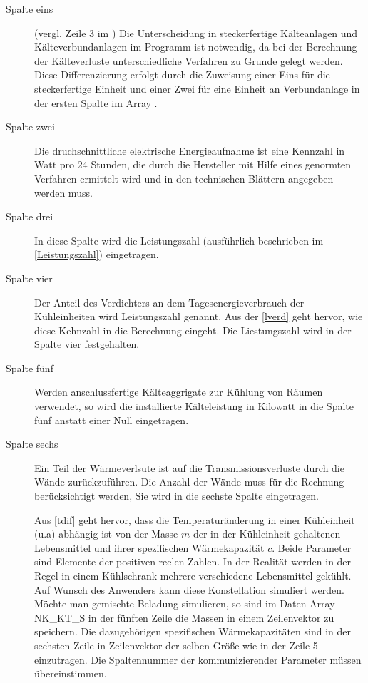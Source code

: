 \begin{description}

	\item [{Spalte eins}] (vergl. Zeile 3 im ) Die Unterscheidung in
	steckerfertige Kälteanlagen und Kälteverbundanlagen im Programm ist notwendig, da bei der Berechnung der
	Kälteverluste unterschiedliche Verfahren zu Grunde gelegt werden.  Diese
	Differenzierung erfolgt durch die Zuweisung einer Eins für die steckerfertige Einheit und einer Zwei für eine Einheit
	an Verbundanlage in der ersten Spalte im Array .

	\item [{Spalte zwei}] Die druchschnittliche elektrische Energieaufnahme ist eine Kennzahl in Watt pro 24 Stunden, die
	durch die Hersteller mit Hilfe eines genormten Verfahren ermittelt wird und in den technischen Blättern angegeben
	werden muss.

	\item [{Spalte drei}] In diese Spalte wird die Leistungszahl (ausführlich beschrieben im \cref{Leistungszahl})
	eingetragen.

	\item [{Spalte vier}] Der Anteil des Verdichters an dem Tagesenergieverbrauch der Kühleinheiten wird Leistungszahl
	genannt. Aus der \cref{lverd} geht hervor, wie diese Kehnzahl in die Berechnung eingeht. Die Liestungszahl wird in
	der Spalte vier festgehalten.

	\item [{Spalte fünf}] Werden anschlussfertige Kälteaggrigate zur Kühlung von Räumen verwendet, so wird die
	installierte Kälteleistung in Kilowatt in die Spalte fünf anstatt einer Null eingetragen.

	\item [{Spalte sechs}] Ein Teil der Wärmeverlsute ist auf die Transmissionsverluste durch die Wände zurückzuführen.
	Die Anzahl der Wände muss für die Rechnung berücksichtigt werden, Sie wird in die sechste Spalte eingetragen.
	
	Aus \cref{tdif} geht hervor, dass die Temperaturänderung in einer Kühleinheit (u.a) abhängig
	ist von der Masse $m$ der in der Kühleinheit gehaltenen Lebensmittel und ihrer spezifischen Wärmekapazität $c$. Beide
	Parameter sind Elemente der positiven reelen Zahlen.  In der Realität werden in der Regel in einem Kühlschrank
	mehrere verschiedene Lebensmittel gekühlt.  Auf Wunsch des Anwenders kann diese Konstellation simuliert werden.
	Möchte man gemischte Beladung simulieren, so sind im Daten-Array NK\_KT\_S in der fünften Zeile die Massen in einem
	Zeilenvektor zu speichern. Die dazugehörigen spezifischen Wärmekapazitäten sind in der sechsten Zeile in Zeilenvektor
	der selben Größe wie in der Zeile 5 einzutragen. Die Spaltennummer der kommunizierender
	Parameter müssen übereinstimmen.


\end{description}
